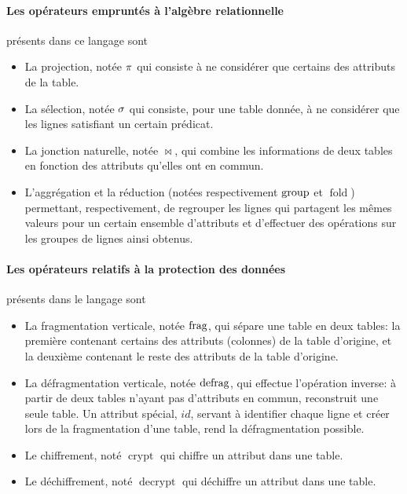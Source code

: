 \paragraph{Les opérateurs empruntés à l'algèbre relationnelle}
présents dans ce langage sont
\begin{itemize}
	\item La projection, notée $\proj$ 
	qui consiste à ne considérer que certains des attributs de la table.
	\item La sélection, notée $\sel$
	qui consiste, pour une table donnée, à ne considérer que
	les lignes satisfiant un certain prédicat.
	\item La jonction naturelle, notée $\Join$, qui combine
	les informations de deux tables en fonction des attributs qu'elles ont
	en commun.
	\item L'aggrégation et la réduction
	(notées respectivement $\operatorname{group}$ et $\operatorname{fold}$)
	permettant, respectivement, 
	de regrouper les lignes qui partagent les mêmes valeurs
	pour un certain ensemble d'attributs
	et d'effectuer des opérations sur les groupes de lignes ainsi obtenus.
\end{itemize}

\paragraph{Les opérateurs relatifs à la protection des données}
présents dans le langage sont
\begin{itemize}
	\item La fragmentation verticale, notée $\operatorname{frag}$,
	qui sépare une table en deux tables: la première contenant certains
	des attributs (colonnes) de la table d'origine, et la deuxième contenant
	le reste des attributs de la table d'origine.
	
	\item La défragmentation verticale, notée $\operatorname{defrag}$,
	qui effectue l'opération inverse: à partir de deux
	tables n'ayant pas d'attributs en commun, reconstruit une seule table.
	Un attribut spécial, $id$, servant à identifier chaque ligne et créer lors de 
	la fragmentation d'une table, rend la défragmentation possible.
	
	\item Le chiffrement, noté $\operatorname{crypt}$
	qui chiffre un attribut dans une table.
	
	\item Le déchiffrement, noté $\operatorname{decrypt}$
	qui déchiffre un attribut dans une table.
\end{itemize}

